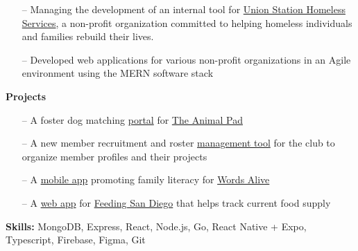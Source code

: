 


\begin{itemize}
    \item[--] Managing the development of an internal tool for \href{https://unionstationhs.org/}{Union Station Homeless Services}, a non-profit organization committed to helping homeless individuals and families rebuild their lives.
    \item[--] Developed web applications for various non-profit organizations in an Agile environment using the MERN software stack
\end{itemize}

\smallskip
\textbf{Projects}\\
\begin{itemize}
    \item[--] A foster dog matching \href{https://github.com/TritonSE/TAP-Foster-Dog-Matching}{portal} for \href{https://theanimalpad.org}{The Animal Pad}
    \item[--] A new member recruitment and roster \href{https://github.com/TritonSE/TSE-Oktavian}{management tool} for the club to organize member profiles and their projects
    \item[--] A \href{https://github.com/TritonSE/WA-Family-Literacy-Application}{mobile app} promoting family literacy for \href{https://www.wordsalive.org}{Words Alive}
    \item[--] A \href{https://github.com/TritonSE/FSD-Supply-Chain}{web app} for \href{https://feedingsandiego.org}{Feeding San Diego} that helps track current food supply
\end{itemize}

\smallskip
\textbf{Skills:} MongoDB, Express, React, Node.js, Go, React Native + Expo, Typescript, Firebase, Figma, Git




